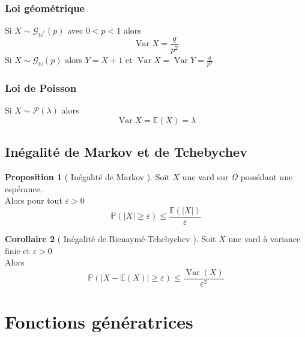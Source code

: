 \documentclass[10pt,a4paper]{article}
\theoremstyle{definition}
\newtheorem{proposition}{Proposition}[section]
\newtheorem{corollary}[proposition]{Corollaire}
\DeclareMathOperator{\var}{Var}
\begin{document}
\subsubsection{Loi géométrique}
\noindent Si \(X \sim \mathcal{G}_{\mathbb{N}^*}(p)\) avec \(0 < p < 1\) alors
\[\boxed{\var X = \frac{q}{p^2}}\]
Si \(X \sim \mathcal{G}_{\mathbb{N}}(p)\) alors \(Y = X + 1\) et \(\var X = \var Y = \frac{q}{p^2}\)

\subsubsection{Loi de Poisson}
\noindent Si \(X \sim \mathcal{P}(\lambda)\) alors
\[\boxed{\var X = \mathbb{E}(X) = \lambda}\]

\subsection{Inégalité de Markov et de Tchebychev}
\begin{proposition}[ Inégalité de Markov ]
    Soit \(X\) une vard sur \(\Omega\) possédant une espérance. \\
    Alors pour tout \(\varepsilon > 0\)
    \[\boxed{\mathbb{P}(|X| \geq \varepsilon) \leq \frac{\mathbb{E}(|X|)}{\varepsilon}}\]
\end{proposition}
\begin{corollary}[ Inégalité de Bienaymé-Tchebychev ]
    Soit \(X\) une vard à variance finie et \(\varepsilon > 0\) \\
    Alors \[\boxed{\mathbb{P}\left(|X - \mathbb{E}(X)| \geq \varepsilon\right) \leq \frac{\var(X)}{\varepsilon^2}}\]
\end{corollary}

\section{Fonctions génératrices}
\end{document}
